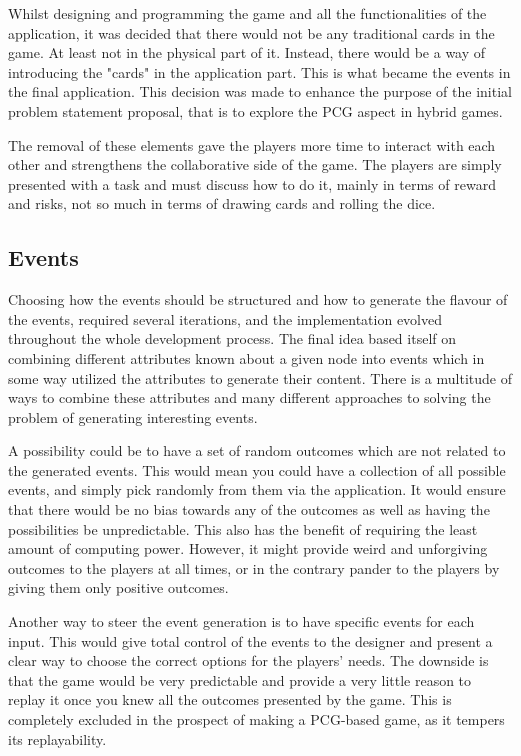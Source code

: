 Whilst designing and programming the game and all the functionalities of the application, it was decided that there would not be any traditional cards in the game. At least not in the physical part of it. Instead, there would be a way of introducing the "cards" in the application part.
This is what became the events in the final application. This decision was made to enhance the purpose of the initial problem statement proposal, that is to explore the PCG aspect in hybrid games.

The removal of these elements gave the players more time to interact with each other and strengthens the collaborative side of the game. The players are simply presented with a task and must discuss how to do it, mainly in terms of reward and risks, not so much in terms of drawing cards and rolling the dice.

\subsection{Events}
Choosing how the events should be structured and how to generate the flavour of the events, required several iterations, and the implementation evolved throughout the whole development process. The final idea based itself on combining different attributes known about a given node into events which in some way utilized the attributes to generate their content. There is a multitude of ways to combine these attributes and many different approaches to solving the problem of generating interesting events.

A possibility could be to have a set of random outcomes which are not related to the generated events. This would mean you could have a collection of all possible events, and simply pick randomly from them via the application. It would ensure that there would be no bias towards any of the outcomes as well as having the possibilities be unpredictable. This also has the benefit of requiring the least amount of computing power. However, it might provide weird and unforgiving outcomes to the players at all times, or in the contrary pander to the players by giving them only positive outcomes.

Another way to steer the event generation is to have specific events for each input. This would give total control of the events to the designer and present a clear way to choose the correct options for the players' needs. The downside is that the game would be very predictable and provide a very little reason to replay it once you knew all the outcomes presented by the game. This is completely excluded in the prospect of making a PCG-based game, as it tempers its replayability.

